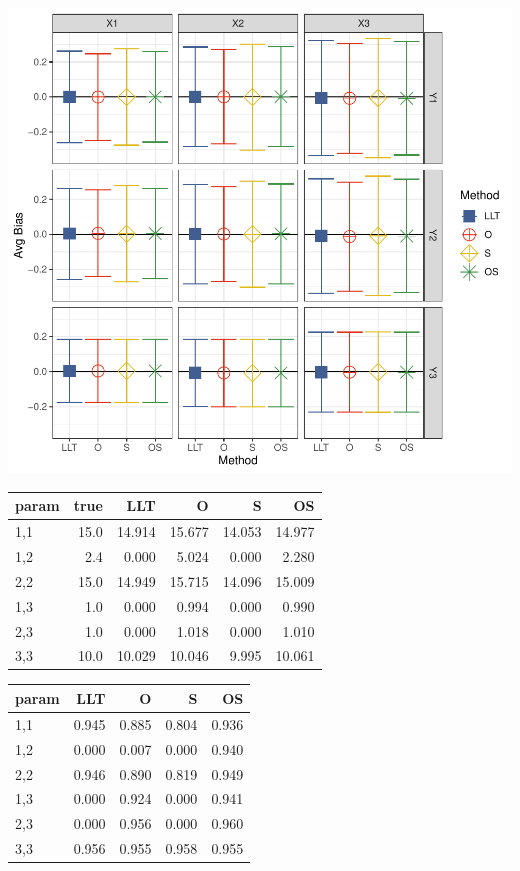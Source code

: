 \documentclass[
]{article}
\begin{document}
\includegraphics{FullSimulation_files/figure-latex/unnamed-chunk-3-1.pdf}

\begin{longtable}[t]{l|r|r|r|r|r}
\hline
param & true & LLT & O & S & OS\\
\hline
1,1 & 15.0 & 14.914 & 15.677 & 14.053 & 14.977\\
\hline
1,2 & 2.4 & 0.000 & 5.024 & 0.000 & 2.280\\
\hline
2,2 & 15.0 & 14.949 & 15.715 & 14.096 & 15.009\\
\hline
1,3 & 1.0 & 0.000 & 0.994 & 0.000 & 0.990\\
\hline
2,3 & 1.0 & 0.000 & 1.018 & 0.000 & 1.010\\
\hline
3,3 & 10.0 & 10.029 & 10.046 & 9.995 & 10.061\\
\hline
\end{longtable}

\begin{longtable}[t]{l|r|r|r|r}
\hline
param & LLT & O & S & OS\\
\hline
1,1 & 0.945 & 0.885 & 0.804 & 0.936\\
\hline
1,2 & 0.000 & 0.007 & 0.000 & 0.940\\
\hline
2,2 & 0.946 & 0.890 & 0.819 & 0.949\\
\hline
1,3 & 0.000 & 0.924 & 0.000 & 0.941\\
\hline
2,3 & 0.000 & 0.956 & 0.000 & 0.960\\
\hline
3,3 & 0.956 & 0.955 & 0.958 & 0.955\\
\hline
\end{longtable}
\end{document}
